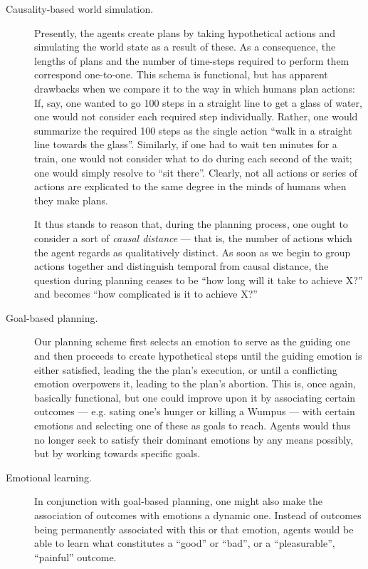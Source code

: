\begin{description}
	\item[Causality-based world simulation.] Presently, the agents create plans by taking hypothetical actions and simulating the world state as a result of these. As a consequence, the lengths of plans and the number of time-steps required to perform them correspond one-to-one.
	This schema is functional, but has apparent drawbacks when we compare it to the way in which humans plan actions: If, say, one wanted to go 100 steps in a straight line to get a glass of water, one would not consider each required step individually. Rather, one would summarize the required 100 steps as the single action ``walk in a straight line towards the glass''. Similarly, if one had to wait ten minutes for a train, one would not consider what to do during each second of the wait; one would simply resolve to ``sit there''. Clearly, not all actions or series of actions are explicated to the same degree in the minds of humans when they make plans.
	
	 It thus stands to reason that, during the planning process, one ought to consider a sort of {\em causal distance} --- that is, the number of actions which the agent regards as qualitatively distinct. As soon as we begin to group actions together and distinguish temporal from causal distance, the question during planning ceases to be ``how long will it take to achieve X?'' and becomes ``how complicated is it to achieve X?''
	 
	 \item[Goal-based planning.] Our planning scheme first selects an emotion to serve as the guiding one and then  proceeds to create hypothetical steps until the guiding emotion is either satisfied, leading the the plan's execution, or until a conflicting emotion overpowers it, leading to the plan's abortion. This is, once again, basically functional, but one could improve upon it by associating certain outcomes --- e.g. sating one's hunger or killing a Wumpus --- with certain emotions and selecting one of these as goals to reach. Agents would thus no longer seek to satisfy their dominant emotions by any means possibly, but by working towards specific goals. 
	 
	 \item[Emotional learning.] In conjunction with goal-based planning, one might also make the association of outcomes with emotions a dynamic one. Instead of outcomes being permanently associated with this or that emotion, agents would be able to learn what constitutes a ``good'' or ``bad'', or a ``pleasurable'', ``painful'' outcome. 
	 

\end{description}
